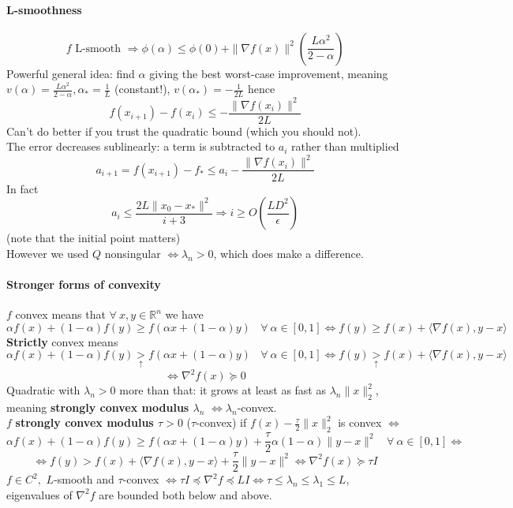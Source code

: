 \documentclass[10pt]{report}
\begin{document}
\paragraph{L-smoothness} $$f \text{ L-smooth }\Rightarrow \phi(\alpha) \leq \phi(0) + \|\nabla f(x)\|^2\left(\frac{L\alpha^2}{2-\alpha}\right)$$
Powerful general idea: find $\alpha$ giving the best worst-case improvement, meaning $v(\alpha) = \frac{L\alpha^2}{2-\alpha}, \alpha_* = \frac{1}{L}$ (constant!), $v(\alpha_*) = -\frac{1}{2L}$ hence $$f(x_{i+1}) - f(x_i) \leq -\frac{\|\nabla f(x_i)\|^2}{2L}$$ Can't do better if you trust the quadratic bound (which you should not).\\
The error decreases sublinearly: a term is subtracted to $a_i$ rather than multiplied $$a_{i+1} = f(x_{i+1}) - f_* \leq a_i - \frac{\|\nabla f(x_i)\|^2}{2L}$$
In fact $$a_i\leq \frac{2L\|x_0 - x_*\|^2}{i+3} \Rightarrow i\geq O\left(\frac{LD^2}{\epsilon}\right)$$ (note that the initial point matters)\\
However we used $Q$ nonsingular $\Leftrightarrow \lambda_n > 0$, which does make a difference.
\paragraph{Stronger forms of convexity}
$f$ convex means that $\forall\:x,y\in \mathbb{R}^n$ we have $$\alpha f(x) + (1-\alpha)f(y)\geq f(\alpha x+ (1-\alpha)y)\:\:\:\:\forall\:\alpha\in[0,1] \Leftrightarrow f(y)\geq f(x) + \langle \nabla f(x), y-x\rangle$$
\textbf{Strictly} convex means $$\alpha f(x) + (1-\alpha)f(y)\underset{\uparrow}{>} f(\alpha x+ (1-\alpha)y)\:\:\:\:\forall\:\alpha\in[0,1] \Leftrightarrow f(y)\underset{\uparrow}{>} f(x) + \langle \nabla f(x), y-x\rangle$$
$$\Leftrightarrow\nabla^2f(x)\succeq 0$$
Quadratic with $\lambda_n > 0$ more than that: it grows at least as fast as $\lambda_n\|x\|_2^2$, meaning \textbf{strongly convex modulus $\lambda_n$} $\Leftrightarrow \lambda_n$-convex.\\
$f$ \textbf{strongly convex modulus $\tau > 0$} ($\tau$-convex) if $f(x)-\frac{\tau}{2}\|x\|_2^2$ is convex $\Leftrightarrow$ $$\alpha f(x) + (1-\alpha)f(y)\geq f(\alpha x+ (1-\alpha)y)+\frac{\tau}{2}\alpha(1-\alpha)\|y-x\|^2\:\:\:\:\forall\:\alpha\in[0,1] \Leftrightarrow$$ $$\Leftrightarrow f(y)> f(x) + \langle \nabla f(x), y-x\rangle+\frac{\tau}{2}\|y-x\|^2 \Leftrightarrow\nabla^2 f(x) \succeq \tau I$$
$f \in C^2,$ $L$-smooth and $\tau$-convex $\Leftrightarrow \tau I \preceq \nabla^2 f\preceq LI \Leftrightarrow \tau \leq \lambda_n \leq \lambda_1 \leq L$, eigenvalues of $\nabla^2 f$ are bounded both below and above.
\end{document}
